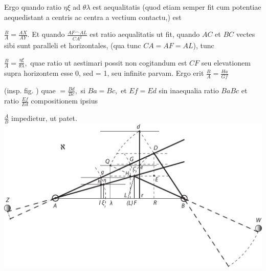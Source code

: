Ergo quando ratio $\eta\xi$ ad $\theta\lambda$ est aequalitatis (quod etiam semper fit cum potentiae\protect{} aequedistant a centris ac centra a vectium\protect{} contactu,) est \rule[-4mm]{0mm}{10mm}$\displaystyle\frac{B}{A}=\frac{AX}{AY}.$
Et quando $\displaystyle\frac{AF\smallfrown AL}{CA^2}$ est ratio aequalitatis ut fit,
quando $AC$ et $BC$ vectes\protect{} sibi sunt paralleli et horizontales, (qua tunc $CA=AF=AL$),
tunc \rule[-4mm]{0mm}{10mm}$\displaystyle\frac{B}{A}=\frac{\eta\xi}{\theta\lambda},$ quae ratio ut aestimari possit non cogitandum est $CF$ seu elevationem supra horizontem esse 0, sed = 1, seu infinite parvam.
Ergo erit $\displaystyle\frac{B}{A}=\frac{Ha}{Gf}$\rule[-4mm]{0mm}{10mm}
(insp. fig. ) quae $\displaystyle=\frac{Bd}{Bc},$ si $Ba=Bc,$ et $Ef=Ed$ sin inaequalia  ratio $\displaystyle{Ba}{Bc}$ et ratio $\displaystyle\frac{Ef}{Ed}$ compositionem ipsius \rule[-4mm]{0mm}{10mm}$\displaystyle\frac{A}{B}$ impedietur, ut patet.
\pend
\newpage
\pstart
\centering\includegraphics[trim = 0mm 0mm 0mm 0mm, clip,width=1.18\textwidth, angle=90]{images/LH037,03_078r-d1.pdf}
\pend
\vspace{2mm}
\pstart
{}
\pend
\count{}
\count{}
\count{}
